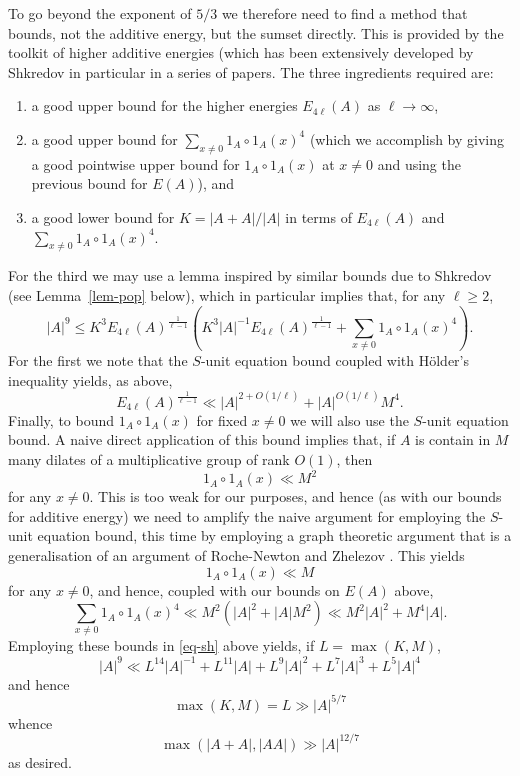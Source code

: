 \documentclass{amsart}
\renewcommand{\leq}{\leqslant}
\renewcommand{\geq}{\geqslant}
\newcommand{\abs}[1]{\left\lvert #1\right\rvert}
\newcommand{\brac}[1]{\left( #1\right)}
\theoremstyle{definition}
\begin{document}
To go beyond the exponent of $5/3$ we therefore need to find a method that bounds, not the additive energy, but the sumset directly. This is provided by the toolkit of higher additive energies (which has been extensively developed by Shkredov in particular in a series of papers. The three ingredients required are:
\begin{enumerate}
\item a good upper bound for the higher energies $E_{4\ell}(A)$ as $\ell\to \infty$,
\item a good upper bound for $\sum_{x\neq 0}1_A\circ 1_A(x)^4$ (which we accomplish by giving a good pointwise upper bound for $1_A\circ 1_A(x)$ at $x\neq 0$ and using the previous bound for $E(A)$), and 
\item a good lower bound for $K=\abs{A+A}/\abs{A}$ in terms of $E_{4\ell}(A)$ and $\sum_{x\neq 0} 1_A\circ 1_A(x)^4$.
\end{enumerate}

For the third we may use a lemma inspired by similar bounds due to Shkredov (see Lemma~\ref{lem-pop} below), which in particular implies that, for any $\ell \geq 2$,
\begin{equation}\label{eq-sh}
\abs{A}^{9}\leq K^3E_{4\ell}(A)^{\frac{1}{\ell-1}}\brac{K^3\abs{A}^{-1}E_{4\ell}(A)^{\frac{1}{\ell-1}}+\sum_{x\neq 0}1_A\circ 1_A(x)^4}.
\end{equation}
For the first we note that the $S$-unit equation bound coupled with H\"{o}lder's inequality yields, as above,
\[E_{4\ell}(A)^{\frac{1}{\ell-1}} \ll \abs{A}^{2+O(1/\ell)}+\abs{A}^{O(1/\ell)}M^4.\]
Finally, to bound $1_A\circ 1_A(x)$ for fixed $x\neq 0$ we will also use the $S$-unit equation bound. A naive direct application of this bound implies that, if $A$ is contain in $M$ many dilates of a multiplicative group of rank $O(1)$, then 
\[1_A\circ 1_A(x)\ll M^{2}\]
for any $x\neq 0$. This is too weak for our purposes, and hence (as with our bounds for additive energy) we need to amplify the naive argument for employing the $S$-unit equation bound, this time by employing a graph theoretic argument that is a generalisation of an argument of Roche-Newton and Zhelezov \cite{RoZh15}. This yields
\[1_A\circ 1_A(x)\ll M\]
for any $x\neq 0$, and hence, coupled with our bounds on $E(A)$ above,
\[\sum_{x\neq 0}1_A\circ 1_A(x)^4 \ll M^2\brac{\abs{A}^2+\abs{A}M^2}\ll M^2\abs{A}^2+M^4\abs{A}.\]
Employing these bounds in \eqref{eq-sh} above yields, if $L=\max(K,M)$,
\[\abs{A}^9 \ll L^{14}\abs{A}^{-1}+ L^{11}\abs{A}+L^9\abs{A}^2+L^7\abs{A}^3+L^5\abs{A}^4\]
and hence
\[\max(K,M)=L\gg \abs{A}^{5/7}\]
whence
\[\max(\abs{A+A},\abs{AA})\gg \abs{A}^{12/7}\]
as desired.
\end{document}
